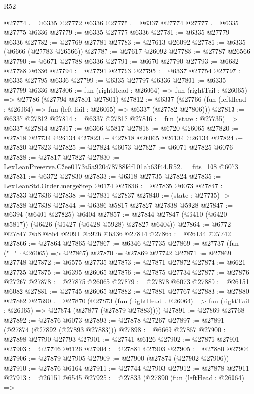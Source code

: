 \begin{lexlean}{R52}
\begin{coremodule}
@27774 := @6335 @27772 @6336
@27775 := @6337 @27774
@27777 := @6335 @27775 @6336
@27779 := @6335 @27777 @6336
@27781 := @6335 @27779 @6336
@27782 := @27769 @27781
@27783 := @27613 @26092
@27786 := @6335 (@6666 (@27783 @26566))
@27787 := @27617 @26092
@27788 := @27787 @26566
@27790 := @6671 @27788 @6336
@27791 := @6670 @27790
@27793 := @6682 @27788 @6336
@27794 := @27791 @27793
@27795 := @6337 @27754
@27797 := @6335 @27795 @6336
@27799 := @6335 @27797 @6336
@27801 := @6335 @27799 @6336
@27806 := fun (rightHead : @26064) => fun (rightTail : @26065) => @27786 (@27794 @27801 @27801)
@27812 := @6337
    (@27766 (fun (leftHead : @26064) => fun (leftTail : @26065) => @6337 (@27782 @27806)))
@27813 := @6337 @27812
@27814 := @6337 @27813
@27816 := fun (state : @27735) => @6337 @27814
@27817 := @6366 @5817
@27818 := @6720 @26065
@27820 := @27818 @27734 @26134
@27823 := @27818 @26065 @26134 @26134
@27824 := @27820 @27823
@27825 := @27824 @6073
@27827 := @6071 @27825 @6076
@27828 := @27817 @27827
@27830 := LexLeanPreserve.C2ee0173a5a920c78788fdf101ab63f44.R52.__fits_108 @6073
@27831 := @6372 @27830
@27833 := @6318 @27735 @27824
@27835 := LexLeanStd.Order.mergeStep @6174
@27836 := @27835 @6073
@27837 := @27833 @27836
@27838 := @27831 @27837
@27840 := (state : @27735) -> @27828 @27838
@27844 := @6386 @5817 @27827 @27838 @5928
@27847 := @6394 (@6401 @27825) @6404
@27857 := @27844 @27847 (@6410 (@6420 @5817)) (@6426 (@6427 (@6428 @5928) @27827 @6404))
@27864 := @6772 @27847 @58 @854 @2091 @5926 @6336 @27814
@27865 := @26134 @27742
@27866 := @27864 @27865
@27867 := @6346 @27735
@27869 := @27737 (fun ("_" : @26065) => @27867)
@27870 := @27869 @27742
@27871 := @27869 @27748
@27872 := @6575 @27735
@27873 := @27871 @27872
@27874 := @6621 @27735
@27875 := @6395 @26065
@27876 := @27875 @27734
@27877 := @27876 @27267
@27878 := @27875 @26065
@27879 := @27878 @6073
@27880 := @26151 @6082
@27881 := @27745 @26065
@27882 := @27881 @27767
@27883 := @27880 @27882
@27890 := @27870
    (@27873
      (fun (rightHead : @26064) => fun (rightTail : @26065) => @27874 (@27877 (@27879 @27883))))
@27891 := @27869 @27768
@27892 := @27876 @6073
@27893 := @27878 @27267
@27897 := @27891 (@27874 (@27892 (@27893 @27883)))
@27898 := @6669 @27867
@27900 := @27898 @27790 @27793
@27901 := @27741 @6126
@27902 := @27876 @27901
@27903 := @27746 @6126
@27904 := @27881 @27903
@27905 := @27880 @27904
@27906 := @27879 @27905
@27909 := @27900 (@27874 (@27902 @27906))
@27910 := @27876 @6164
@27911 := @27744 @27903
@27912 := @27878 @27911
@27913 := @26151 @6545
@27925 := @27833
    (@27890
      (fun (leftHead : @26064) =>

\end{coremodule}
\end{lexlean}
